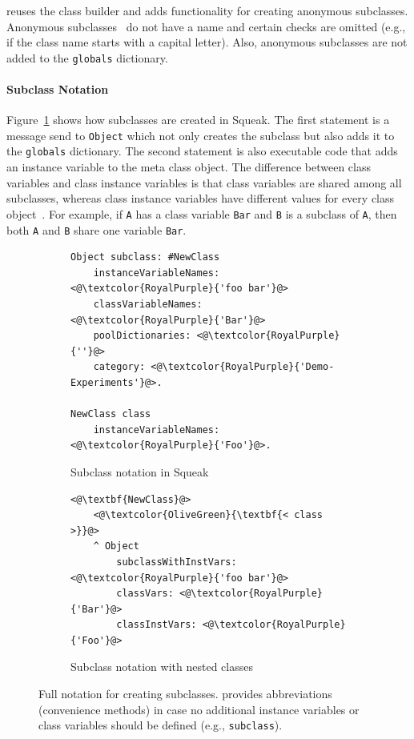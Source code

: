 \msname reuses the class builder and adds functionality for creating anonymous subclasses. Anonymous subclasses~\cite{Ducasse99evaluatingmessage} do not have a name and certain checks are omitted (e.g., if the class name starts with a capital letter). Also, anonymous subclasses are not added to the \texttt{globals} dictionary.

\paragraph{Subclass Notation}
Figure~\ref{fig:impl_subclass_squeak} shows how subclasses are created in Squeak. The first statement is a message send to \texttt{Object} which not only creates the subclass but also adds it to the \texttt{globals} dictionary. The second statement is also executable code that adds an instance variable to the meta class object. The difference between class variables and class instance variables is that class variables are shared among all subclasses, whereas class instance variables have different values for every class object~\cite{classvar1,classvar2}. For example, if \texttt{A} has a class variable \texttt{Bar} and \texttt{B} is a subclass of \texttt{A}, then both \texttt{A} and \texttt{B} share one variable \texttt{Bar}.

\begin{figure}[!htp]
\begin{subfigure}[b]{\textwidth}
\begin{lstlisting}
Object subclass: #NewClass
    instanceVariableNames: <@\textcolor{RoyalPurple}{'foo bar'}@>
    classVariableNames: <@\textcolor{RoyalPurple}{'Bar'}@>
    poolDictionaries: <@\textcolor{RoyalPurple}{''}@>
    category: <@\textcolor{RoyalPurple}{'Demo-Experiments'}@>.

NewClass class
	instanceVariableNames: <@\textcolor{RoyalPurple}{'Foo'}@>.
\end{lstlisting}
\caption{Subclass notation in Squeak}
\label{fig:impl_subclass_squeak}
\end{subfigure}

\vspace{15pt}

\begin{subfigure}[b]{\textwidth}
\begin{lstlisting}
<@\textbf{NewClass}@>
    <@\textcolor{OliveGreen}{\textbf{< class >}}@>
    ^ Object 
        subclassWithInstVars: <@\textcolor{RoyalPurple}{'foo bar'}@>
        classVars: <@\textcolor{RoyalPurple}{'Bar'}@>
        classInstVars: <@\textcolor{RoyalPurple}{'Foo'}@>
\end{lstlisting}
\caption{Subclass notation with nested classes}
\label{fig:impl_subclass_nested}
\end{subfigure}
\caption[Notation for creating subclasses]{Full notation for creating subclasses. \msname provides abbreviations (convenience methods) in case no additional instance variables or class variables should be defined (e.g., \texttt{subclass}).}
\end{figure}

